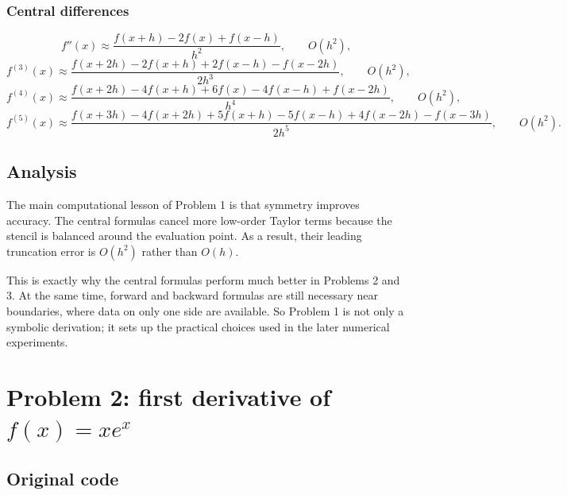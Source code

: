 \documentclass[12pt,a4paper]{article}
\begin{document}
\subsubsection{Central differences}

\[
f''(x)\approx \frac{f(x+h)-2f(x)+f(x-h)}{h^2}, \qquad O(h^2),
\]
\[
f^{(3)}(x)\approx \frac{f(x+2h)-2f(x+h)+2f(x-h)-f(x-2h)}{2h^3}, \qquad O(h^2),
\]
\[
f^{(4)}(x)\approx \frac{f(x+2h)-4f(x+h)+6f(x)-4f(x-h)+f(x-2h)}{h^4}, \qquad O(h^2),
\]
\[
f^{(5)}(x)\approx \frac{f(x+3h)-4f(x+2h)+5f(x+h)-5f(x-h)+4f(x-2h)-f(x-3h)}{2h^5}, \qquad O(h^2).
\]

\subsection{Analysis}

The main computational lesson of Problem 1 is that symmetry improves accuracy. The central formulas cancel more low-order Taylor terms because the stencil is balanced around the evaluation point. As a result, their leading truncation error is $O(h^2)$ rather than $O(h)$.

This is exactly why the central formulas perform much better in Problems 2 and 3. At the same time, forward and backward formulas are still necessary near boundaries, where data on only one side are available. So Problem 1 is not only a symbolic derivation; it sets up the practical choices used in the later numerical experiments.

\section{Problem 2: first derivative of $f(x)=xe^x$}

\subsection{Original code}
\end{document}
